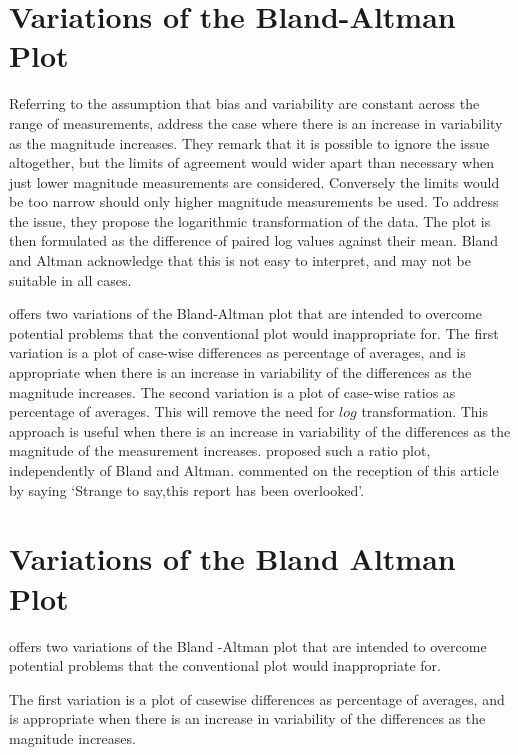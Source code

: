 \documentclass[Chap2main.tex]{subfiles}
\begin{document}
	
\section{Variations of the Bland-Altman Plot} Referring to the
assumption that bias and variability are constant across the range
of measurements, \citet{BA99} address the case where there is an
increase in variability as the magnitude increases. They remark
that it is possible to ignore the issue altogether, but the limits
of agreement would wider apart than necessary when just lower
magnitude measurements are considered. Conversely the limits would
be too narrow should only higher magnitude measurements be used.
To address the issue, they propose the logarithmic transformation
of the data. The plot is then formulated as the difference of
paired log values against their mean. Bland and Altman acknowledge
that this is not easy to interpret, and may not be suitable in
all cases.

\citet{BA99} offers two variations of the Bland-Altman plot that
are intended to overcome potential problems that the conventional
plot would inappropriate for. The first variation is a plot of
case-wise differences as percentage of averages, and is
appropriate when there is an increase in variability of the
differences as the magnitude increases. The second variation is a
plot of case-wise ratios as percentage of averages. This will
remove the need for $log$ transformation. This approach is useful
when there is an increase in variability of the differences as the
magnitude of the measurement increases. \citet{Eksborg} proposed
such a ratio plot, independently of Bland and Altman.
\citet{Dewitte} commented on the reception of this article by
saying `Strange to say,this report has been overlooked'.

\section{Variations of the Bland Altman Plot}
\citet{BA99} offers two variations of the Bland -Altman plot that
are intended to overcome potential problems that the conventional
plot would inappropriate for.

The first variation is a plot of casewise differences as
percentage of averages, and is appropriate when there is an
increase in variability of the differences as the magnitude
increases.


\end{document}
